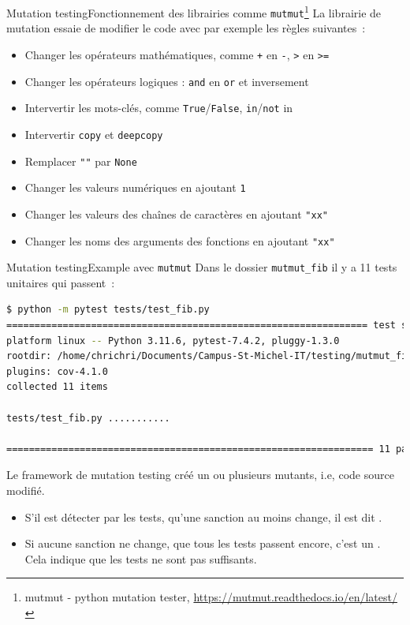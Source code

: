 \documentclass{beamer}
\begin{document}
    \begin{frame}{Mutation testing}{Fonctionnement des librairies comme \lstinline{mutmut}\footnote{mutmut - python mutation tester, \url{https://mutmut.readthedocs.io/en/latest/}}}
        \transdissolve
        La librairie de mutation essaie de modifier le code avec par exemple les règles suivantes~:
        \begin{itemize}
            \item Changer les opérateurs mathématiques, comme \lstinline{+} en \lstinline{-}, \lstinline{>} en \lstinline{>=}
            \item Changer les opérateurs logiques : \lstinline{and} en \lstinline{or} et inversement
            \item Intervertir les mots-clés, comme \lstinline{True}/\lstinline{False}, \lstinline{in}/\lstinline{not} in
            \item Intervertir \lstinline{copy} et \lstinline{deepcopy}
            \item Remplacer \lstinline{""} par \lstinline{None}
            \item Changer les valeurs numériques en ajoutant \lstinline{1}
            \item Changer les valeurs des chaînes de caractères en ajoutant \lstinline{"xx"}
            \item Changer les noms des arguments des fonctions en ajoutant \lstinline{"xx"}
        \end{itemize}
    \end{frame}


    \begin{frame}[fragile]{Mutation testing}{Example avec \lstinline{mutmut}}
        \transdissolve
        Dans le dossier \lstinline{mutmut_fib} il y a 11 tests unitaires qui passent~:
        \begin{lstlisting}[language=bash]
$ python -m pytest tests/test_fib.py
================================================================ test session starts ======
platform linux -- Python 3.11.6, pytest-7.4.2, pluggy-1.3.0
rootdir: /home/chrichri/Documents/Campus-St-Michel-IT/testing/mutmut_fib
plugins: cov-4.1.0
collected 11 items

tests/test_fib.py ...........                                                                                                                  [100%]

================================================================= 11 passed in 0.04s ======
        \end{lstlisting}
        Le framework de mutation testing créé un ou plusieurs mutants, i.e, code source modifié.
        \begin{itemize}
            \item S'il est détecter par les tests, qu'une sanction au moins change, il est dit .
            \item Si aucune sanction ne change, que tous les tests passent encore, c'est un . Cela indique que les tests ne sont pas suffisants.
        \end{itemize}
    \end{frame}
\end{document}
